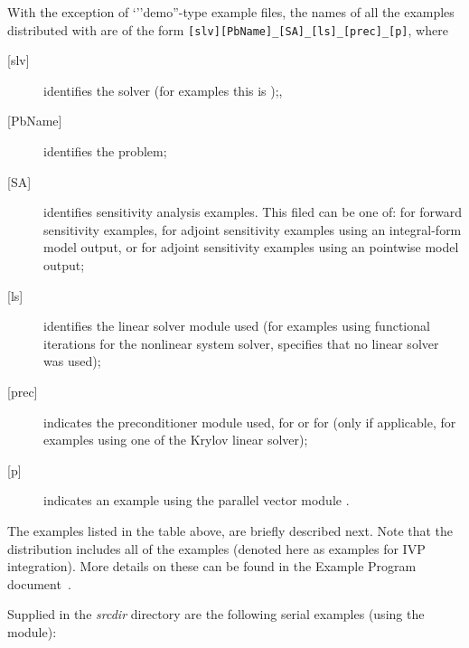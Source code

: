 \vspace{0.2in}\noindent
With the exception of `''demo''-type example files, the names of all the examples 
distributed with {\sundials} are of the form \verb![slv][PbName]_[SA]_[ls]_[prec]_[p]!, 
where
\begin{description}
\item [{[slv]}] identifies the solver (for {\cvodes} examples this is );, 
\item [{[PbName]}] identifies the problem;
\item [{[SA]}] identifies sensitivity analysis examples. This filed can be one
  of:  for forward sensitivity examples,  for adjoint sensitivity
  examples using an integral-form model output, or  for adjoint sensitivity
  examples using an pointwise model output;
\item [{[ls]}] identifies the linear solver module used (for examples using
  functional iterations for the nonlinear system solver,  specifies
  that no linear solver was used);
\item [{[prec]}] indicates the {\cvodes} preconditioner module used, 
   for {\cvbandpre} or  for {\cvbbdpre} 
  (only if applicable, for examples using one of the Krylov linear solver);
\item [{[p]}] indicates an example using the parallel vector module {\nvecp}.
\end{description}

\vspace{0.2in}\noindent
The examples listed in the table above, are briefly described next.
Note that the {\cvodes} distribution includes all of the {\cvode} {\C}
examples (denoted here as examples for IVP integration). More details on
these can be found in the {\cvode} Example Program document~\cite{cvode_ex}.


\vspace{0.2in}\noindent
Supplied in the {\em srcdir} directory are the
following serial examples (using the {\nvecs} module):

